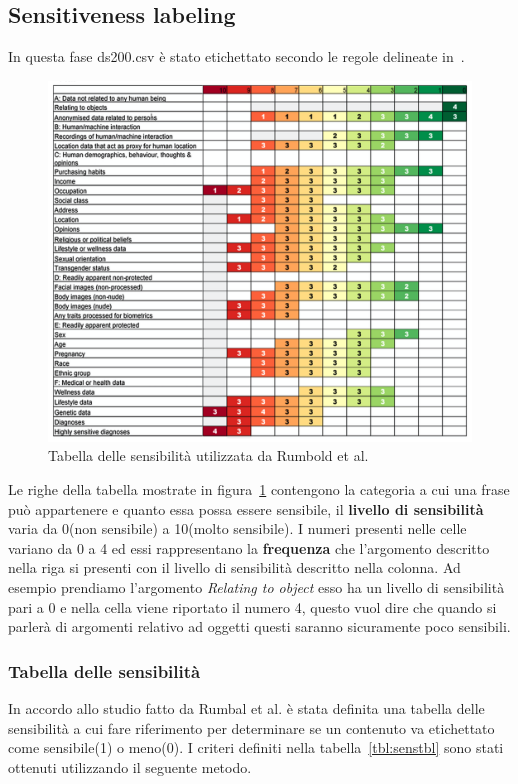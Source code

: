 \subsection{Sensitiveness labeling}
\label{ssec:sens_labeling}
In questa fase ds200.csv è stato etichettato secondo le regole delineate in~\cite{dataSpectrum}.
\begin{figure}
    \centering
    \includegraphics[scale=0.4]{Figure/sensTbl.png}
    \caption{Tabella delle sensibilità utilizzata da Rumbold et al.}
    \label{fig:sensRumbald}
\end{figure}
\FloatBarrier
Le righe della tabella mostrate in figura~\ref{fig:sensRumbald} contengono la categoria a cui una frase può appartenere e quanto essa possa essere sensibile, il \textbf{livello di sensibilità} varia da 0(non sensibile) a 10(molto sensibile). I numeri presenti nelle celle variano da 0 a 4 ed essi rappresentano la \textbf{frequenza} che l'argomento descritto nella riga si presenti con il livello di sensibilità descritto nella colonna. Ad esempio prendiamo l'argomento \textit{Relating to object} esso ha un livello di sensibilità pari a 0 e nella cella viene riportato il numero 4, questo vuol dire che quando si parlerà di argomenti relativo ad oggetti questi saranno sicuramente poco sensibili.


\subsubsection{Tabella delle sensibilità}
In accordo allo studio fatto da Rumbal et al. è stata definita una tabella delle sensibilità a cui fare riferimento per determinare se un contenuto va etichettato come sensibile(1) o meno(0). I criteri definiti nella tabella~\ref{tbl:senstbl} sono stati ottenuti utilizzando il seguente metodo.

